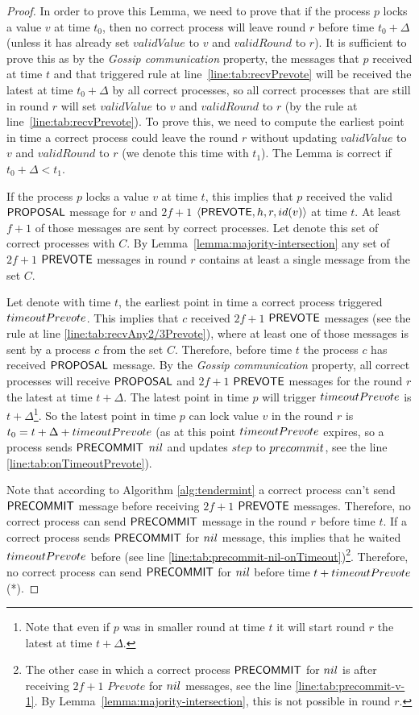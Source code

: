 \begin{proof}
In order to prove this Lemma, we need to prove that if the process $p$ locks a value $v$ at time $t_0$, then no correct process will leave round $r$ before time $t_0 + \Delta$ (unless it has already set $validValue$ to $v$ and $validRound$ to $r$). It is sufficient to prove this as by the \emph{Gossip communication} property, the messages that $p$ received at time $t$ and that triggered rule at line~\ref{line:tab:recvPrevote} will be received the latest at time $t_0 + \Delta$ by all correct processes, so all correct processes that are still in round $r$ will set $validValue$ to $v$ and $validRound$ to $r$ (by the rule at line~\ref{line:tab:recvPrevote}). To prove this, we need to compute the earliest point in time a correct process could leave the round $r$ without updating $validValue$ to $v$ and $validRound$ to $r$ (we denote this time with $t_1$). The Lemma is correct if $t_0 + \Delta < t_1$. 

If the process $p$ locks a value $v$ at time $t$, this implies that $p$ received the valid $\mathsf{PROPOSAL}$ message for $v$ and $2f+1$ $\langle\mathsf{PREVOTE},h,r,id(v)\rangle$ at time $t$. At least $f+1$ of those messages are sent by correct processes. Let denote this set of correct processes with $C$. By Lemma~\ref{lemma:majority-intersection} any set of $2f+1$ $\mathsf{PREVOTE}$ messages in round $r$ contains at least a single message from the set $C$. 

Let denote with time $t$, the earliest point in time a correct process triggered $timeoutPrevote$. This implies that $c$ received $2f+1$ $\mathsf{PREVOTE}$ messages
(see the rule at line \ref{line:tab:recvAny2/3Prevote}), where at least one of those messages is sent by a process $c$ from the set $C$.  Therefore, before time $t$ the process $c$ has received $\mathsf{PROPOSAL}$ message. By the \emph{Gossip communication} property, all correct processes will receive $\mathsf{PROPOSAL}$ and $2f+1$ $\mathsf{PREVOTE}$ messages for the round $r$ the latest at time $t+\Delta$. The latest point in time $p$ will trigger $timeoutPrevote$ is $t+\Delta$\footnote{Note that even if $p$ was in smaller round at time $t$ it will start round $r$ the latest at time $t+\Delta$.}.  So the latest point in time $p$ can lock value $v$ in the round $r$ is $t_0 = t+\Delta+timeoutPrevote$ (as at this point $timeoutPrevote$ expires, so a process sends $\mathsf{PRECOMMIT}$ $nil$ and updates $step$ to $precommit$, see the line \ref{line:tab:onTimeoutPrevote}).  

Note that according to Algorithm \ref{alg:tendermint} a correct process can't send $\mathsf{PRECOMMIT}$ message before receiving $2f+1$ $\mathsf{PREVOTE}$ messages.  Therefore, no correct process can send $\mathsf{PRECOMMIT}$ message in the round $r$ before time $t$. If a correct process sends $\mathsf{PRECOMMIT}$ for $nil$ message, this implies that he waited $timeoutPrevote$ before (see line \ref{line:tab:precommit-nil-onTimeout})\footnote{The other case in which a correct process $\mathsf{PRECOMMIT}$ for $nil$ is after receiving $2f+1$ $Prevote$ for $nil$ messages, see the line \ref{line:tab:precommit-v-1}. By Lemma~\ref{lemma:majority-intersection}, this is not possible in round $r$.}. Therefore, no correct process can send $\mathsf{PRECOMMIT}$ for $nil$ before time $t + timeoutPrevote$ (*).


\end{proof}
